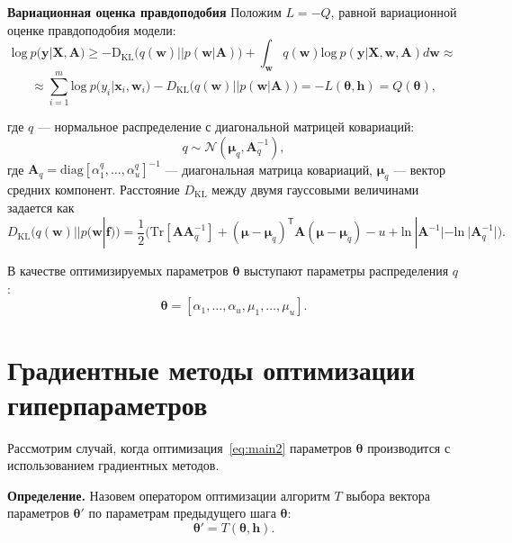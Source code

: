 \textbf{Вариационная оценка правдоподобия}
Положим $L=-Q$, равной вариационной оценке правдоподобия модели:
\begin{equation} 
\label{eq:elbo}
\text{log}~p(\mathbf{y}|\mathbf{X},\mathbf{A})  
\geq 
-\text{D}_\text{KL} \bigl(q(\mathbf{w})||p(\mathbf{w}|\mathbf{A})\bigr) + \int_{\mathbf{w}} q(\mathbf{w})\text{log}~{p(\mathbf{y}|\mathbf{X},\mathbf{w},\mathbf{A})} d \mathbf{w}  \approx
\end{equation}
\[
\approx \sum_{i=1}^m \text{log}~p({y}_i|\mathbf{x}_i, \mathbf{w}_i) - D_\text{KL}\bigl(q (\mathbf{w}) || p (\mathbf{w}|\mathbf{A})\bigr) = -L(\boldsymbol{\theta}, \mathbf{h}) = Q(\boldsymbol{\theta}),
\]

где $q$ --- нормальное распределение с диагональной матрицей ковариаций:
\begin{equation}
\label{eq:diag}
	q \sim \mathcal{N}(\boldsymbol{\mu}_q, \mathbf{A}^{-1}_q),
\end{equation}
где $\mathbf{A}_q = \text{diag}[\alpha^q_1, \dots, \alpha^q_u]^{-1}$ --- диагональная матрица ковариаций, $\boldsymbol{\mu}_q$ --- вектор средних компонент.
Расстояние $D_\text{KL}$ между двумя гауссовыми величинами задается как 
\[
	D_\text{KL}\bigl(q (\mathbf{w}) || p (\mathbf{w}|\mathbf{f})\bigr) = \frac{1}{2} \bigl( \text{Tr} [\mathbf{A}\mathbf{A}^{-1}_q] + (\boldsymbol{\mu} - \boldsymbol{\mu}_q)^\mathsf{T}\mathbf{A}(\boldsymbol{\mu} - \boldsymbol{\mu}_q) - u +\text{ln}~|\mathbf{A}^{-1}| - \text{ln}~|\mathbf{A}_q^{-1}| \bigr).
\]

В качестве оптимизируемых параметров $\boldsymbol{\theta}$ выступают параметры распределения $q$:
\[
\boldsymbol{\theta} = [\alpha_1, \dots, \alpha_u, {\mu}_1,\dots,{\mu}_u].
\]




\section{Градиентные методы оптимизации гиперпараметров}
Рассмотрим случай, когда оптимизация~\eqref{eq:main2} параметров $\boldsymbol{\theta}$ производится с использованием градиентных методов. 

\textbf{Определение.} Назовем оператором оптимизации алгоритм $T$ выбора вектора параметров $\boldsymbol{\theta}'$  по параметрам предыдущего шага $\boldsymbol{\theta}$:
\[
	\boldsymbol{\theta}' = T(\boldsymbol{\theta}, \mathbf{h}).
\]

